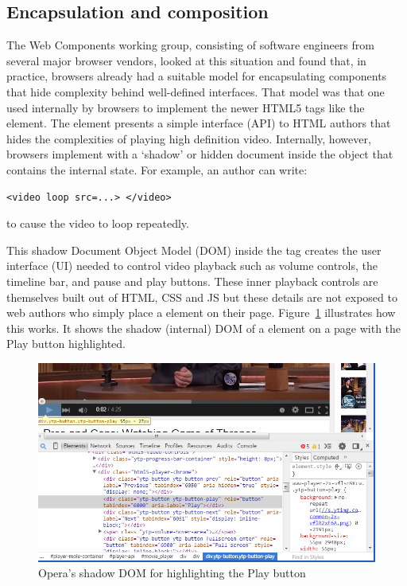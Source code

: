 \subsection{Encapsulation and composition}

The Web Components working group, consisting of software engineers from several major browser vendors, looked at this situation and found that, in practice, browsers already had a suitable model for encapsulating components that hide complexity behind well-defined interfaces.
That model was that one used internally by browsers to implement the newer HTML5 tags like the \textbf{} element. 
The  element presents a simple interface (API) to HTML authors that hides the complexities of playing high definition video.
Internally, however, browsers implement  with a `shadow' or hidden document inside the object that contains the internal state. 
For example, an author can write:
\begin{lstlisting}[language=HTML5]
	<video loop src=...> </video>
\end{lstlisting}
to cause the video to loop repeatedly.

This shadow Document Object Model (DOM) inside the  tag creates the user interface (UI) needed to control video playback such as volume controls, the timeline bar, and pause and play buttons.
These inner playback controls are themselves built out of HTML, CSS and JS but these details are not exposed to web authors who simply place a  element on their page. 
Figure~\ref{f:html5video} illustrates how this works. It shows the shadow (internal) DOM of a  element on a page with the Play button  highlighted.

% 
\begin{figure}[htb]
\centering
 \includegraphics[width=5.5in]{images/html5_video_control.png}
\caption{Opera's shadow DOM for  highlighting the Play button}
\label{f:html5video}
\end{figure}
%

